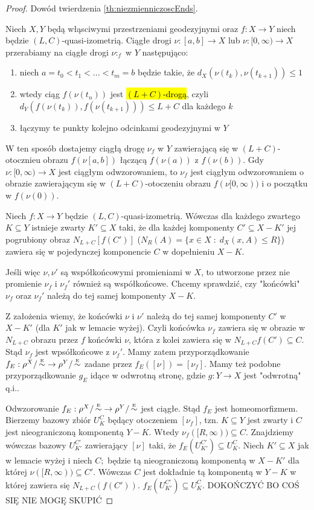 \begin{proof}Dowód twierdzenia \ref{th:niezmienniczoscEnds}.

  Niech $X,Y$ będą włąsciwymi przestrzeniami geodezyjnymi oraz $f:X\to Y$ niech będzie $(L,C)$-quasi-izometrią. Ciągłe drogi $\nu:[a,b]\to X$ lub $\nu:[0,\infty)\to X$ przerabiamy na ciągłe drogi $\nu:_f$ w $Y$ następująco:
  \begin{enumerate}
    \item niech $a=t_0< t_1 < ... <t_m=b$ będzie takie, że $d_X(\nu(t_k),\nu(t_{k+1}))\leq 1$
    \item wtedy ciąg $f(\nu(t_n))$ jest \hl{$(L+C)$-drogą}, czyli $d_Y(f(\nu(t_k)), f(\nu(t_{k+1})))\leq L+C$ dla każdego $k$
    \item łączymy te punkty kolejno odcinkami geodezyjnymi w $Y$
  \end{enumerate}
  W ten sposób dostajemy ciągłą drogę $\nu_f$ w $Y$ zawierającą się w $(L+C)$-otocznieu obrazu $f(\nu[a,b])$ łączącą $f(\nu(a))$ z $f(\nu(b))$. Gdy $\nu:[0,\infty)\to X$ jest ciągłym odwzorowaniem, to $\nu_f$ jest ciągłym odwzorowaniem o obrazie zawierającym się w $(L+C)$-otoczeniu obrazu $f(\nu[0,\infty))$ i o początku w $f(\nu(0))$.
  \begin{lemma}{}{}
    Niech $f:X\to Y$ będzie $(L,C)$-quasi-izometrią. Wówczas dla każdego zwartego $K\subseteq Y$ istnieje zwarty $K'\subseteq X$ taki, że dla każdej komponenty $C'\subseteq X-K'$ jej pogrubiony obraz $N_{L+C}[f(C')]$ ($N_R(A)=\{x\in X\;:\;d_X(x, A)\leq R\}$) zawiera się w pojedynczej komponencie $C$ w dopełnieniu $X-K$.
  \end{lemma}

  Jeśli więc $\nu,\nu'$ są współkońcowymi promieniami w $X$, to utworzone przez nie promienie $\nu_f$ i $\nu_f'$ również są współkońcowe. Chcemy sprawdzić, czy "końcówki" $\nu_f$ oraz $\nu_f'$ należą do tej samej komponenty $X-K$.

  Z założenia wiemy, że końcówki $\nu$ i $\nu'$ należą do tej samej komponenty $C'$ w $X-K'$ (dla $K'$ jak w lemacie wyżej). Czyli końcówka $\nu_f$ zawiera się w obrazie w $N_{L+C}$ obrazu przez $f$ końcówki $\nu$, która z kolei zawiera się w $N_{L+C}f(C')\subseteq C$. Stąd $\nu_f$ jest wpsółkońcowe z $\nu_f'$. Mamy zatem przyporządkowanie $f_E:\rho^X/\operatorname{\overset{{\scriptscriptstyle E}}{\sim}} \to \rho^Y/\operatorname{\overset{{\scriptscriptstyle E}}{\sim}}$ zadane przez $f_E([\nu])=[\nu_f]$. Mamy też podobne przyporządkowanie $g_E$ idące w odwrotną stronę, gdzie $g:Y\to X$ jest "odwrotną" q.i..

  Odwzorowanie $f_E:\rho^X/\operatorname{\overset{{\scriptscriptstyle E}}{\sim}}\to \rho^Y/\operatorname{\overset{{\scriptscriptstyle E}}{\sim}}$ jest ciągłe. Stąd $f_E$ jest homeomorfizmem. Bierzemy bazowy zbiór $U_K^C$ będący otoczeniem $[\nu_f]$, tzn. $K\subseteq Y$ jest zwarty i $C$ jest nieograniczoną komponentą $Y-K$. Wtedy $\nu_f([R,\infty))\subseteq C$. Znajdziemy wówczas bazowy $U_{K'}^{C'}$ zawierający $[\nu]$ taki, że $f_E(U_{K'}^{C'})\subseteq U_K^C$. Niech $K'\subseteq X$ jak w lemacie wyżej i niech $C;$ będzie tą nieograniczoną komponentą w $X-K'$ dla której $\nu([R,\infty))\subseteq C'$. Wówczas $C$ jest dokładnie tą komponentą w $Y-K$ w której zawiera się $N_{L+C}(f(C'))$. $f_E(U_{K'}^{C'})\subseteq U_K^C$. {\large\color{red}DOKOŃCZYĆ BO COŚ SIĘ NIE MOGĘ SKUPIĆ}
\end{proof}


